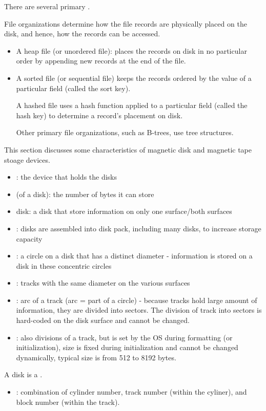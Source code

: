       \par There are several primary .
      \par File organizations determine how the file records are physically placed on the disk, and hence, how the records can be accessed.
      \begin{itemize}
        \item A heap file (or unordered file): places the records on disk in no particular order by appending new records at the end of the file.
        \item A sorted file (or sequential file) keeps the records ordered by the value of a particular field (called the sort key).
        \par A hashed file uses a hash function applied to a particular field (called the hash key) to determine a record’s placement on disk.
        \par Other primary file organizations, such as B-trees, use tree structures.
      \end{itemize}

  \par This section discusses some characteristics of magnetic disk and magnetic tape stoage devices.

      \begin{itemize}
        \item {}: the device that holds the disks
        \item {} (of a disk): the number of bytes it can store
        \item {} disk: a disk that store information on only one surface/both surfaces
        \item {}: disks are assembled into disk pack, including many disks, to increase storage capacity
        \item {}: a circle on a disk that has a distinct diameter - information is stored on a disk in these concentric circles
        \item {}: tracks with the same diameter on the various surfaces
        \item {}: arc of a track (arc = part of a circle) - because tracks hold large amount of information, they are divided into sectors. The division of track into sectors is hard-coded on the disk surface and cannot be changed.
        \item {}: also divisions of a track, but is set by the OS during formatting (or initialization), size is fixed during initialization and cannot be changed dynamically, typical size is from 512 to 8192 bytes.
      \end{itemize}
      \par A disk is a .
      \begin{itemize}
        \item {}: combination of cylinder number, track number (within the cyliner), and block number (within the track).
      \end{itemize}

